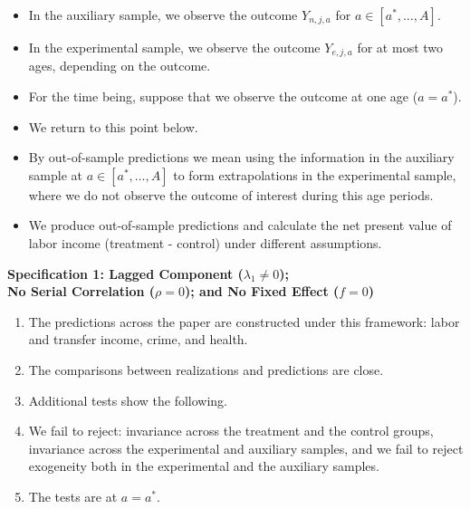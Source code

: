 \documentclass[static]{JJH-Beamer}
\begin{document}
\begin{frame}

\begin{itemize}
\item In the auxiliary sample, we observe the outcome $Y_{n,j,a}$ for $a \in [a^*, \ldots, A]$.
\item In the experimental sample, we observe the outcome $Y_{e,j,a}$ for at most two ages, depending on the outcome.
\item For the time being, suppose that we observe the outcome at one age ($a = a^*$).
\item We return to this point below.
\item By out-of-sample predictions we mean using the information in the auxiliary sample at  $a \in [a^*, \ldots, A]$ to form extrapolations in the experimental sample, where we do not observe the outcome of interest during this age periods.
\item We produce out-of-sample predictions and calculate the net present value of labor income (treatment - control) under different assumptions.
\end{itemize}

\end{frame}

\begin{frame}

\textbf{Specification 1: Lagged Component ($\lambda_{1} \neq 0$); \\ No Serial Correlation ($\rho = 0$); and No Fixed Effect ($f = 0$)}

\begin{enumerate}
\item The predictions across the paper are constructed under this framework: labor and transfer income, crime, and health.
\item The comparisons between realizations and predictions are close.
\item Additional tests show the following.
\item We fail to reject: invariance across the treatment and the control groups, invariance across the experimental and auxiliary samples, and we fail to reject exogeneity both in the experimental and the auxiliary samples.
\item The tests are at $a = a^*$.
\end{enumerate}

\end{frame}
\end{document}
